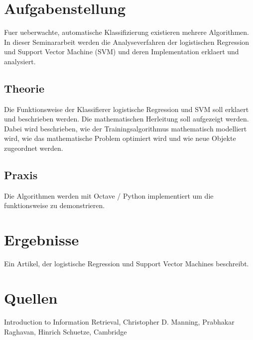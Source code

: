 \documentclass[11pt]{article}
\begin{document}
\section{Aufgabenstellung}
\label{sec-2}

Fuer ueberwachte, automatische Klassifizierung existieren mehrere Algorithmen. In dieser Seminararbeit werden die Analyseverfahren der logistischen Regression und Support Vector Machine (SVM) und deren Implementation erklaert und analysiert.
\subsection{Theorie}
\label{sec-2-1}

Die Funktionsweise der Klassifierer logistische Regression und SVM soll erklaert und beschrieben werden. Die mathematischen Herleitung soll aufgezeigt werden. Dabei wird beschrieben, wie der Trainingsalgorithmus mathematisch modelliert wird, wie das mathematische Problem optimiert wird und wie neue Objekte zugeordnet werden.
\subsection{Praxis}
\label{sec-2-2}

Die Algorithmen werden mit Octave / Python implementiert um die funktionsweise zu demonstrieren.
\section{Ergebnisse}
\label{sec-3}

Ein Artikel, der logistische Regression und Support Vector Machines beschreibt.
\section{Quellen}
\label{sec-4}

Introduction  to Information Retrieval, Christopher D. Manning, Prabhakar Raghavan, Hinrich Schuetze, Cambridge
\end{document}
